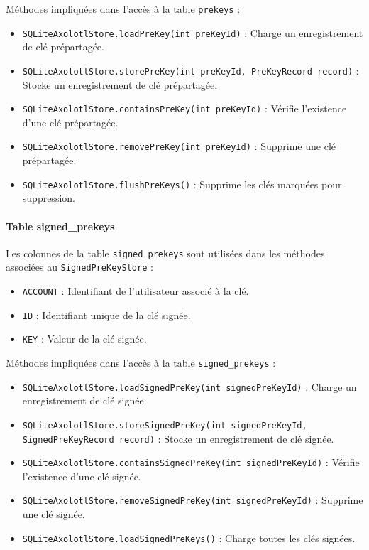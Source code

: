 \documentclass[a4paper,11pt]{article}
\begin{document}
Méthodes impliquées dans l'accès à la table \texttt{prekeys} :
\begin{itemize}
    \item \texttt{SQLiteAxolotlStore.loadPreKey(int preKeyId)} : Charge un enregistrement de clé prépartagée.
    \item \texttt{SQLiteAxolotlStore.storePreKey(int preKeyId, PreKeyRecord record)} : Stocke un enregistrement de clé prépartagée.
    \item \texttt{SQLiteAxolotlStore.containsPreKey(int preKeyId)} : Vérifie l'existence d'une clé prépartagée.
    \item \texttt{SQLiteAxolotlStore.removePreKey(int preKeyId)} : Supprime une clé prépartagée.
    \item \texttt{SQLiteAxolotlStore.flushPreKeys()} : Supprime les clés marquées pour suppression.
\end{itemize}

\paragraph{Table signed\_prekeys}
Les colonnes de la table \texttt{signed\_prekeys} sont utilisées dans les méthodes associées au \texttt{SignedPreKeyStore} :
\begin{itemize}
    \item \texttt{ACCOUNT} : Identifiant de l'utilisateur associé à la clé.
    \item \texttt{ID} : Identifiant unique de la clé signée.
    \item \texttt{KEY} : Valeur de la clé signée.
\end{itemize}

Méthodes impliquées dans l'accès à la table \texttt{signed\_prekeys} :
\begin{itemize}
    \item \texttt{SQLiteAxolotlStore.loadSignedPreKey(int signedPreKeyId)} : Charge un enregistrement de clé signée.
    \item \texttt{SQLiteAxolotlStore.storeSignedPreKey(int signedPreKeyId, SignedPreKeyRecord record)} : Stocke un enregistrement de clé signée.
    \item \texttt{SQLiteAxolotlStore.containsSignedPreKey(int signedPreKeyId)} : Vérifie l'existence d'une clé signée.
    \item \texttt{SQLiteAxolotlStore.removeSignedPreKey(int signedPreKeyId)} : Supprime une clé signée.
    \item \texttt{SQLiteAxolotlStore.loadSignedPreKeys()} : Charge toutes les clés signées.
\end{itemize}
\end{document}
